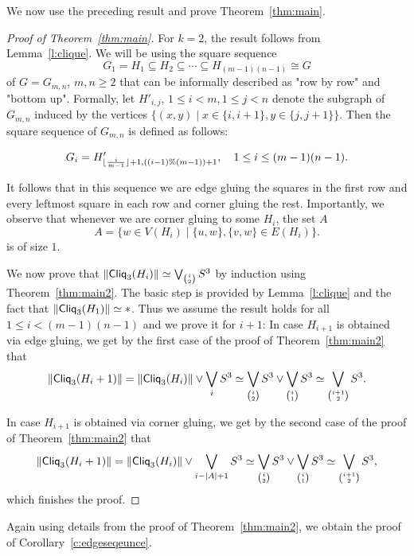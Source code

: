 \documentclass[a4paper, v2021]{lipics-v2021}
\theoremstyle{plain}
\theoremstyle{definition}
\newcommand{\Cliq}[2]{\mathsf{Cliq}_{#1}(#2)}
\DeclarePairedDelimiter{\gr}{\lVert}{\rVert}
\DeclarePairedDelimiter{\floor}{\lfloor}{\rfloor}
\begin{document}
We now use the preceding result and prove Theorem~\ref{thm:main}.
\begin{proof}[Proof of Theorem~\ref{thm:main}]
For $k = 2$, the result follows from Lemma~\ref{l:clique}. 
We will be using the square sequence
\[
G_1 = H_1 \subseteq H_2 \subseteq \cdots \subseteq H_{(m-1)(n-1)} \cong G
\]
of $G = G_{m,n}$, $m,n \geq 2$ that can be informally described as "row by row" and "bottom up". Formally, let $H'_{i,j}$, $1\leq i<m,1\leq j<n$ denote the subgraph of $G_{m,n}$ induced by the vertices $\{(x,y) \mid x\in\{i,i+1\}, y \in \{j,j+1 \}\}$. Then the square sequence of $G_{m,n}$ is defined as follows:

\[
G_i = H'_{\floor{\frac{i}{m-1}} + 1 , ((i-1) \% (m-1)) + 1}, \quad 1\leq i\leq (m-1)(n-1).
\]

It follows that in this sequence we are edge gluing  the squares in the first row and every leftmost square in each row and corner gluing the rest. 
Importantly, we observe that whenever we are corner gluing to some $H_i$, the set $A$ 
\[A = \{w \in V(H_{i}) \mid \{u,w\}, \{v,w\} \in E(H_{i})\}.\]
is of size $1$. 

We now prove that $\gr{\Cliq{3}{H_i}} \simeq \bigvee_{\binom{i}{2}} S^3$ by induction using Theorem~\ref{thm:main2}. The basic step is provided by Lemma~\ref{l:clique} and the fact that $\gr{\Cliq{3}{H_1}} \simeq *$. 
Thus we assume the result holds for all $1\leq i< (m-1)(n-1)$ and we prove it for $i+1$: In case $H_{i+1}$ is obtained via edge gluing, we get by the first case of the proof of Theorem~\ref{thm:main2} that 
\[
\gr{\Cliq{3}{H_i+1}} = \gr{\Cliq{3}{H_{i}}} \vee \bigvee_{i} S^3 \simeq \bigvee_{\binom{i}{2}} S^3 \vee \bigvee_{\binom{i}{1}} S^3 \simeq \bigvee_{\binom{i+1}{2}} S^3.
\]

In case $H_{i+1}$ is obtained via corner gluing, we get by the second case of the proof of Theorem~\ref{thm:main2} that 
\[
\gr{\Cliq{3}{H_i+1}} = \gr{\Cliq{3}{H_{i}}} \vee \bigvee_{i - |A| + 1} S^3 \simeq \bigvee_{\binom{i}{2}} S^3 \vee \bigvee_{\binom{i}{1}} S^3 \simeq \bigvee_{\binom{i+1}{2}} S^3,
\]
which finishes the proof.
\end{proof}
Again using details from the proof of Theorem~\ref{thm:main2}, we obtain the proof of Corollary~\ref{c:edgeseqeunce}.
\end{document}
